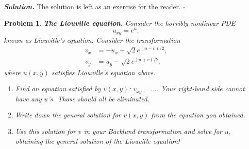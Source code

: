 \documentclass[12pt]{report}
\newtheorem{problem}{Problem}
\newenvironment{solution}[1][\it{Solution}]{\textbf{#1. } }{$\square$}
\begin{document}
\begin{solution}
    \noindent
    The solution is left as an exercise for the reader.
\end{solution}

\newpage



\begin{problem}
    {\bf The Liouville equation}. Consider the horribly nonlinear PDE
\[
u_{xy}=e^u,
\]
known as Liouville's equation. Consider the transformation
\begin{align*}
v_x&=-u_x+\sqrt{2}e^{(u-v)/2},\\
v_y&=u_y-\sqrt{2}e^{(u+v)/2},
\end{align*}
where $u(x,y)$ satisfies Liouville's equation above.

\begin{enumerate}

\item [a] Find an equation satisfied by $v(x,y)$: $v_{xy}=\ldots$. Your right-hand side cannot have any $u$'s. Those should all be eliminated.
\item [b] Write down the general solution for $v(x,y)$ from the equation you obtained.

\item [c] Use this solution for $v$ in your B\"acklund transformation and solve for $u$, obtaining the general solution of the Liouville equation!

\end{enumerate}
\end{problem}
\end{document}
